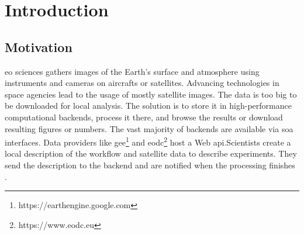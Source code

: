 \documentclass[draft,final]{vutinfth} %
\begin{document}

\tableofcontents %

\mainmatter

\chapter{Introduction}\label{Introduction}

\section{Motivation}\label{Motivation}\label{Use Cases}
\gls{eo} sciences gathers images of the Earth's surface and atmosphere using instruments and cameras on aircrafts or satellites. Advancing technologies in space agencies lead to the usage of mostly satellite images. The data is too big to be downloaded for local analysis. The solution is to store it in high-performance computational backends, process it there, and browse the results or download resulting figures or numbers. The vast majority of backends are available via \gls{soa} interfaces. Data providers like \gls{gee}\footnote{https://earthengine.google.com} and \gls{eodc}\footnote{https://www.eodc.eu} host a Web \gls{api}.Scientists create a local description of the workflow and satellite data to describe experiments. They send the description to the backend and are notified when the processing finishes \cite{geocloud}. 
\end{document}

